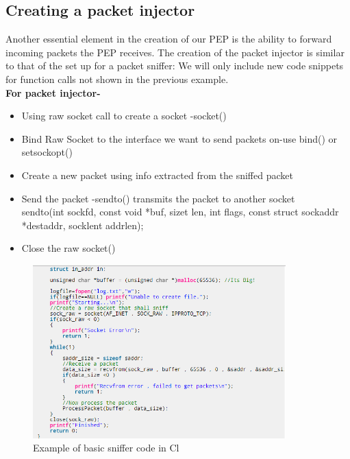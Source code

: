 \documentclass{uathesis}
\begin{document}
\subsection{Creating a packet injector}
Another essential element in the creation of our PEP is the ability to forward incoming packets the PEP receives.  
The creation of the packet injector is similar to that of the set up for a packet sniffer: We will only include new code snippets for function calls not shown in the previous example.   \\

\textbf{For packet injector-}\\ 
    \begin{itemize}
        \item Using raw socket call to create a socket -socket()
        \item Bind Raw Socket to the interface we want to send packets on-use bind() or setsockopt()
        \item Create a new packet using info extracted from the sniffed packet
        \item Send the packet -sendto() transmits the packet to another socket \\
sendto(int sockfd, const void *buf, size\textunderscore t len, int flags,
               const struct sockaddr *dest\textunderscore addr, socklen\textunderscore t addrlen);        
        \item Close the raw socket()\\
    \end{itemize}

\begin{figure}[h!]
    \centering
    \includegraphics[width=0.87\textwidth]{SnifferCode.PNG}
    \caption{Example of basic sniffer code in Cl
    }
    \label{fig:Sniffer code in C}
\end{figure}
\end{document}
